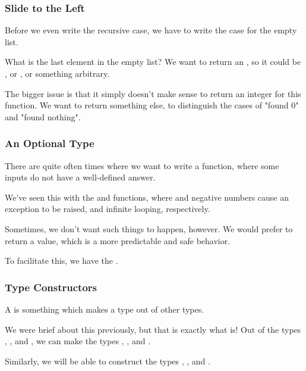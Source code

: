 \documentclass[aspectratio=169]{beamer}
\begin{document}
\begin{frame}[fragile]
  \frametitle{Slide to the Left}

  Before we even write the recursive case, we have to write the case for
  the empty list.

  \vspace{\fill}

  What is the last element in the empty list? We want to return an
  , so it could be , or , or something arbitrary.

  \vspace{\fill}

  The bigger issue is that it simply doesn't make sense to return an integer
  for this function. We want to return something else, to distinguish the
  cases of "found 0" and "found nothing".
\end{frame}

\begin{frame}[fragile]
  \frametitle{An Optional Type}

  There are quite often times where we want to write a function, where some inputs
  do not have a well-defined answer.

  We've seen this with the  and  functions, where  and 
  negative numbers cause an exception to be raised, and infinite looping, respectively.

  Sometimes, we don't want such things to happen, however. We would prefer to return
  a value, which is a more predictable and safe behavior.

  To facilitate this, we have the  . 
\end{frame}

\begin{frame}[fragile]
  \frametitle{Type Constructors}

  A  is something which makes a type out of other types. 

  We were brief about this previously, but that is exactly what  is!
  Out of the types , , and , we can make
  the types , , and .

  Similarly, we will be able to construct the types , ,
  and .
\end{frame}
\end{document}
